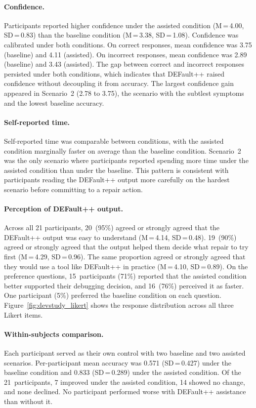 \paragraph{Confidence.}
Participants reported higher confidence under the assisted condition (M\,=\,4.00, SD\,=\,0.83) than the baseline condition (M\,=\,3.38, SD\,=\,1.08). Confidence was calibrated under both conditions. On correct responses, mean confidence was 3.75 (baseline) and 4.11 (assisted). On incorrect responses, mean confidence was 2.89 (baseline) and 3.43 (assisted). The gap between correct and incorrect responses persisted under both conditions, which indicates that DEFault++ raised confidence without decoupling it from accuracy. The largest confidence gain appeared in Scenario~2 (2.78 to 3.75), the scenario with the subtlest symptoms and the lowest baseline accuracy.

\paragraph{Self-reported time.}
Self-reported time was comparable between conditions, with the assisted condition marginally faster on average than the baseline condition. Scenario~2 was the only scenario where participants reported spending more time under the assisted condition than under the baseline. This pattern is consistent with participants reading the DEFault++ output more carefully on the hardest scenario before committing to a repair action.

\paragraph{Perception of DEFault++ output.}
Across all 21 participants, 20~(95\%) agreed or strongly agreed that the DEFault++ output was easy to understand (M\,=\,4.14, SD\,=\,0.48). 19~(90\%) agreed or strongly agreed that the output helped them decide what repair to try first (M\,=\,4.29, SD\,=\,0.96). The same proportion agreed or strongly agreed that they would use a tool like DEFault++ in practice (M\,=\,4.10, SD\,=\,0.89). On the preference questions, 15~participants (71\%) reported that the assisted condition better supported their debugging decision, and 16~(76\%) perceived it as faster. One participant (5\%) preferred the baseline condition on each question. Figure~\ref{fig:devstudy_likert} shows the response distribution across all three Likert items.

\paragraph{Within-subjects comparison.}
Each participant served as their own control with two baseline and two assisted scenarios. Per-participant mean accuracy was 0.571 (SD\,=\,0.427) under the baseline condition and 0.833 (SD\,=\,0.289) under the assisted condition. Of the 21~participants, 7 improved under the assisted condition, 14 showed no change, and none declined. No participant performed worse with DEFault++ assistance than without it.

